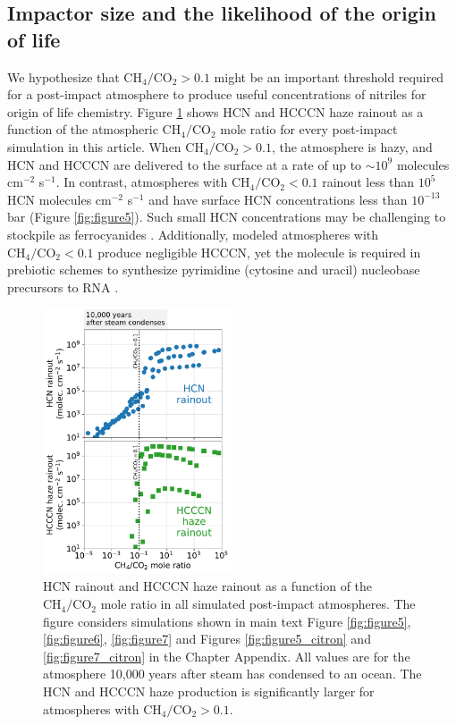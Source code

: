 \subsection{Impactor size and the likelihood of the origin of life}

We hypothesize that $\mathrm{CH_4}/\mathrm{CO_2} > 0.1$ might be an important threshold required for a post-impact atmosphere to produce useful concentrations of nitriles for origin of life chemistry. Figure \ref{fig:figure7_5} shows HCN and HCCCN haze rainout as a function of the atmospheric $\mathrm{CH_4}/\mathrm{CO_2}$ mole ratio for every post-impact simulation in this article. When $\mathrm{CH_4}/\mathrm{CO_2} > 0.1$, the atmosphere is hazy, and HCN and HCCCN are delivered to the surface at a rate of up to $\sim 10^9$ molecules cm$^{-2}$ s$^{-1}$. In contrast, atmospheres with $\mathrm{CH_4}/\mathrm{CO_2} < 0.1$ rainout less than $10^5$ HCN molecules cm$^{-2}$ s$^{-1}$ and have surface HCN concentrations less than $10^{-13}$ bar (Figure \ref{fig:figure5}). Such small HCN concentrations may be challenging to stockpile as ferrocyanides \citep{Toner_2019}. Additionally, modeled atmospheres with $\mathrm{CH_4}/\mathrm{CO_2} < 0.1$ produce negligible HCCCN, yet the molecule is required in prebiotic schemes to synthesize pyrimidine (cytosine and uracil) nucleobase precursors to RNA \citep{Powner_2009,Okamura_2019,Becker_2019}.

\begin{figure}
  \centering
  \includegraphics[width=0.5\textwidth]{tex/5impacts/figures/Figure7_5.pdf}
  \caption{HCN rainout and HCCCN haze rainout as a function of the $\mathrm{CH_4}/\mathrm{CO_2}$ mole ratio in all simulated post-impact atmospheres. The figure considers simulations shown in main text Figure \ref{fig:figure5}, \ref{fig:figure6}, \ref{fig:figure7} and Figures \ref{fig:figure5_citron} and \ref{fig:figure7_citron} in the Chapter Appendix. All values are for the atmosphere 10,000 years after steam has condensed to an ocean. The HCN and HCCCN haze production is significantly larger for atmospheres with $\mathrm{CH_4}/\mathrm{CO_2} > 0.1$.}
  \label{fig:figure7_5}
\end{figure}

